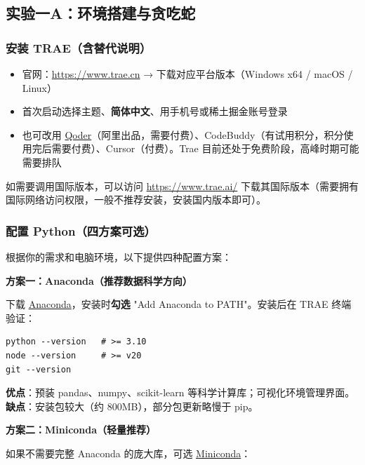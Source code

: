 \documentclass[12pt,a4paper]{ctexart}
\begin{document}
\subsection{实验一A：环境搭建与贪吃蛇}

\subsubsection{安装 TRAE（含替代说明）}

\begin{itemize}[leftmargin=2em]
  \item 官网：\url{https://www.trae.cn} → 下载对应平台版本（Windows x64 / macOS / Linux）
  \item 首次启动选择主题、\textbf{简体中文}、用手机号或稀土掘金账号登录
  \item 也可改用 \href{https://qoder.com}{Qoder}（阿里出品，需要付费）、CodeBuddy（有试用积分，积分使用完后需要付费）、Cursor（付费）。Trae 目前还处于免费阶段，高峰时期可能需要排队
\end{itemize}

\begin{warningbox}[网络访问提示]
如需要调用国际版本，可以访问 \url{https://www.trae.ai/} 下载其国际版本（需要拥有国际网络访问权限，一般不推荐安装，安装国内版本即可）。
\end{warningbox}

\subsubsection{配置 Python（四方案可选）}

根据你的需求和电脑环境，以下提供四种配置方案：

\textbf{方案一：Anaconda（推荐数据科学方向）}

下载 \href{https://www.anaconda.com/download/}{Anaconda}，安装时\textbf{勾选} "Add Anaconda to PATH"。安装后在 TRAE 终端验证：

\begin{lstlisting}[style=shell]
python --version   # >= 3.10
node --version     # >= v20
git --version
\end{lstlisting}

\textbf{优点}：预装 pandas、numpy、scikit-learn 等科学计算库；可视化环境管理界面。\\
\textbf{缺点}：安装包较大（约 800MB），部分包更新略慢于 pip。

\textbf{方案二：Miniconda（轻量推荐）}

如果不需要完整 Anaconda 的庞大库，可选 \href{https://docs.conda.io/en/latest/miniconda.html}{Miniconda}：
\end{document}

